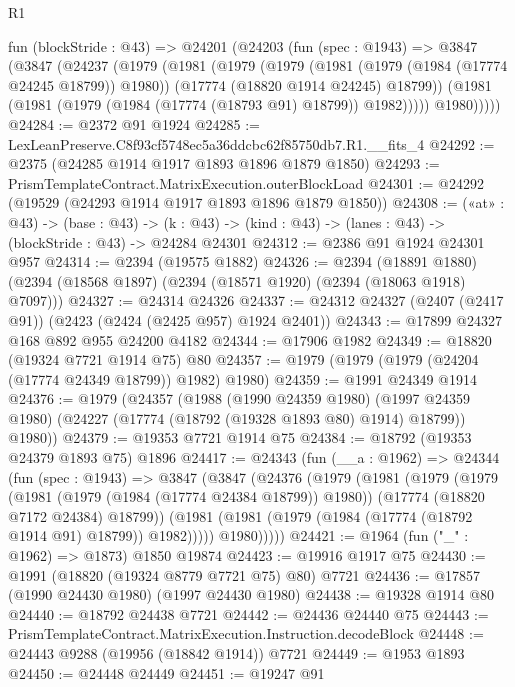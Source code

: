 \begin{lexlean}{R1}
\begin{coremodule}
  fun (blockStride : @43) =>
  @24201
    (@24203
      (fun (spec : @1943) =>
      @3847
        (@3847
          (@24237
            (@1979
              (@1981
                (@1979
                  (@1979
                    (@1981 (@1979 (@1984 (@17774 @24245 @18799)) @1980))
                    (@17774 (@18820 @1914 @24245) @18799))
                  (@1981 (@1981 (@1979 (@1984 (@17774 (@18793 @91) @18799)) @1982)))))
              @1980)))))
@24284 := @2372 @91 @1924
@24285 := LexLeanPreserve.C8f93cf5748ec5a36ddcbc62f85750db7.R1.__fits_4
@24292 := @2375 (@24285 @1914 @1917 @1893 @1896 @1879 @1850)
@24293 := PrismTemplateContract.MatrixExecution.outerBlockLoad
@24301 := @24292 (@19529 (@24293 @1914 @1917 @1893 @1896 @1879 @1850))
@24308 := («at» : @43) ->
  (base : @43) -> (k : @43) -> (kind : @43) -> (lanes : @43) -> (blockStride : @43) -> @24284 @24301
@24312 := @2386 @91 @1924 @24301 @957
@24314 := @2394 (@19575 @1882)
@24326 := @2394
    (@18891 @1880)
    (@2394 (@18568 @1897) (@2394 (@18571 @1920) (@2394 (@18063 @1918) @7097)))
@24327 := @24314 @24326
@24337 := @24312 @24327 (@2407 (@2417 @91)) (@2423 (@2424 (@2425 @957) @1924 @2401))
@24343 := @17899 @24327 @168 @892 @955 @24200 @4182
@24344 := @17906 @1982
@24349 := @18820 (@19324 @7721 @1914 @75) @80
@24357 := @1979 (@1979 (@1979 (@24204 (@17774 @24349 @18799)) @1982) @1980)
@24359 := @1991 @24349 @1914
@24376 := @1979
    (@24357
      (@1988
        (@1990 @24359 @1980)
        (@1997 @24359 @1980)
        (@24227 (@17774 (@18792 (@19328 @1893 @80) @1914) @18799))
        @1980))
@24379 := @19353 @7721 @1914 @75
@24384 := @18792 (@19353 @24379 @1893 @75) @1896
@24417 := @24343
    (fun (__a : @1962) =>
    @24344
      (fun (spec : @1943) =>
      @3847
        (@3847
          (@24376
            (@1979
              (@1981
                (@1979
                  (@1979
                    (@1981 (@1979 (@1984 (@17774 @24384 @18799)) @1980))
                    (@17774 (@18820 @7172 @24384) @18799))
                  (@1981 (@1981 (@1979 (@1984 (@17774 (@18792 @1914 @91) @18799)) @1982)))))
              @1980)))))
@24421 := @1964 (fun ("_" : @1962) => @1873) @1850 @19874
@24423 := @19916 @1917 @75
@24430 := @1991 (@18820 (@19324 @8779 @7721 @75) @80) @7721
@24436 := @17857 (@1990 @24430 @1980) (@1997 @24430 @1980)
@24438 := @19328 @1914 @80
@24440 := @18792 @24438 @7721
@24442 := @24436 @24440 @75
@24443 := PrismTemplateContract.MatrixExecution.Instruction.decodeBlock
@24448 := @24443 @9288 (@19956 (@18842 @1914)) @7721
@24449 := @1953 @1893
@24450 := @24448 @24449
@24451 := @19247 @91

\end{coremodule}
\end{lexlean}
